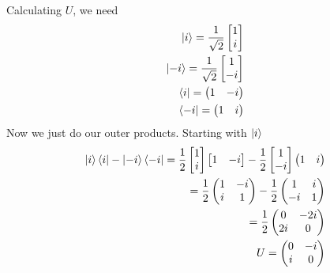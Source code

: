 \documentclass[]{article}
\begin{document}
Calculating \(U\), we need \[
\begin{align}
\ket{i} = \frac{1}{\sqrt{ 2 }}\begin{bmatrix}
1 \\
i 
\end{bmatrix} \\
\ket{-i} = \frac{1}{\sqrt{ 2 }} \begin{bmatrix}
1 \\
-i
\end{bmatrix} \\
\bra{i}  = \begin{pmatrix}
1 & -i
\end{pmatrix} \\
\bra{-i} = \begin{pmatrix}
1 & i
\end{pmatrix} 
\end{align}
\] Now we just do our outer products. Starting with \(\ket{i}\) \[
\begin{align}
\ket{i} \bra{i} -\ket{-i} \bra{-i}   = \frac{1}{2}\begin{bmatrix}
1 \\
i
\end{bmatrix}\begin{bmatrix}
1 & -i
\end{bmatrix}-\frac{1}{2}\begin{bmatrix}
1 \\
-i 
\end{bmatrix}\begin{pmatrix}
1 & i
\end{pmatrix} \\
= \frac{1}{2}\begin{pmatrix}
1 & -i  \\
i & 1
\end{pmatrix}-\frac{1}{2}\begin{pmatrix}
1 & i \\
-i & 1
\end{pmatrix} \\
=\frac{1}{2}\begin{pmatrix}
0 & -2i \\
2i & 0
\end{pmatrix} \\
U=\begin{pmatrix}
0 & -i \\
i & 0
\end{pmatrix}
\end{align}
\]
\end{document}
